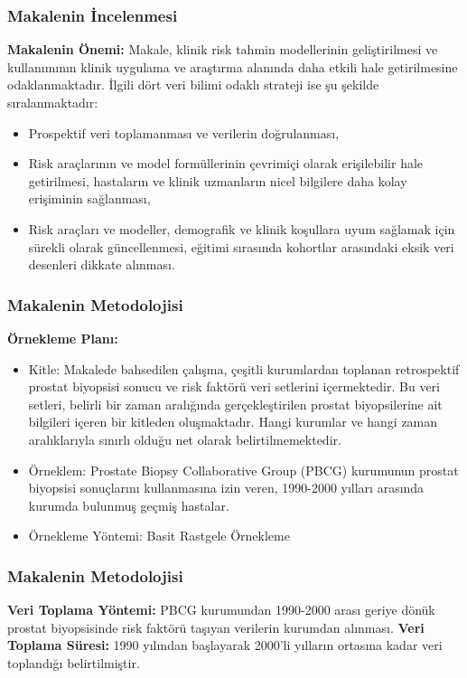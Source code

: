 \documentclass{beamer}
\begin{document}
\begin{frame}

\frametitle{Makalenin İncelenmesi}
\textbf{Makalenin Önemi: }
Makale, klinik risk tahmin modellerinin geliştirilmesi ve kullanımının klinik uygulama ve araştırma alanında daha etkili hale getirilmesine odaklanmaktadır. İlgili dört veri bilimi odaklı strateji ise şu şekilde sıralanmaktadır:

\begin{itemize}
\item Prospektif veri toplamanması ve verilerin doğrulanması,
\item Risk araçlarının ve model formüllerinin çevrimiçi olarak erişilebilir hale getirilmesi, hastaların ve klinik uzmanların nicel bilgilere daha kolay erişiminin sağlanması,
\item Risk araçları ve modeller, demografik ve klinik koşullara uyum sağlamak için sürekli olarak güncellenmesi,
\itemModel eğitimi sırasında kohortlar arasındaki eksik veri desenleri dikkate alınması.
\end{itemize}


\end{frame}


\begin{frame}
\frametitle{Makalenin Metodolojisi}
\textbf{Örnekleme Planı: }
\newline

\begin{itemize}
\item Kitle: Makalede bahsedilen çalışma, çeşitli kurumlardan toplanan retrospektif prostat biyopsisi sonucu ve risk faktörü veri setlerini içermektedir. Bu veri setleri, belirli bir zaman aralığında gerçekleştirilen prostat biyopsilerine ait bilgileri içeren bir kitleden oluşmaktadır. Hangi kurumlar ve hangi zaman aralıklarıyla sınırlı olduğu net olarak belirtilmemektedir.
\item Örneklem: Prostate Biopsy Collaborative Group (PBCG) kurumunun prostat biyopsisi sonuçlarını kullanmasına izin veren, 1990-2000 yılları arasında kurumda bulunmuş geçmiş hastalar.
\item Örnekleme Yöntemi: Basit Rastgele Örnekleme

\end{itemize}

\end{frame}

\begin{frame}
\frametitle{Makalenin Metodolojisi}
\textbf{Veri Toplama Yöntemi: }
PBCG kurumundan 1990-2000 arası geriye dönük prostat biyopsisinde risk faktörü taşıyan verilerin kurumdan alınması. 
\newline
\newline
\textbf{Veri Toplama Süresi: }
1990 yılından başlayarak 2000'li yılların ortasına kadar veri toplandığı belirtilmiştir.

\end{frame}
\end{document}
